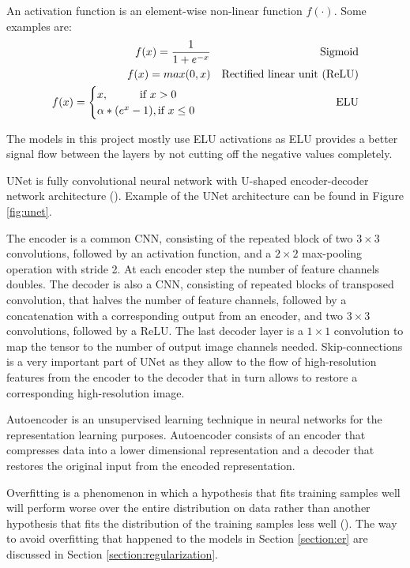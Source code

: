 \begin{definition}
	An activation function is an element-wise non-linear function $f(\cdot)$. Some examples are:
	\begin{align}             
		f(x) = \frac{1}{1 + e^{-x}} &&\text{Sigmoid} \\      
		f(x) = max(0, x) &&\text{Rectified linear unit (ReLU)}\\
		f(x) = \begin{cases}
				x, \hspace*{1cm} \textrm{if } x > 0 \\
				\alpha * (e^{x} - 1), \textrm{if }  x \leq 0
		  	\end{cases}\ &&\text{ELU}
		\end{align}
\end{definition}

The models in this project mostly use ELU activations as ELU provides a better signal flow between the layers by not cutting off the negative values completely.

\begin{definition}[UNet]
	UNet is fully convolutional neural network with U-shaped encoder-decoder network architecture (\cite{Ronneberger_2015}). Example of the UNet architecture can be found in Figure \ref{fig:unet}.
\end{definition}

The encoder is a common CNN, consisting of the repeated
block of two $3 \times 3$ convolutions, followed by
an activation function, and a $2 \times 2$ max-pooling operation with stride 2. At each encoder step  the number of feature channels doubles. The decoder is also a CNN, consisting of repeated blocks of transposed convolution, that halves the number of feature channels, followed by a concatenation with a corresponding output from an encoder, and two $3 \times 3$ convolutions, followed by a ReLU. The last decoder layer is a $1 \times 1$ convolution to map the tensor to the number of output image channels needed. Skip-connections is a very important part of UNet as they allow to the flow of high-resolution features from the encoder to the decoder that in turn allows to restore a corresponding high-resolution image.

\begin{definition}[Autoencoder]
	Autoencoder is an unsupervised learning technique in neural networks for the representation learning purposes. Autoencoder consists of an encoder that compresses data into a lower dimensional representation and a decoder that restores the original input from the encoded representation.
\end{definition}

\begin{definition}[Overfitting]
	Overfitting is a phenomenon in which a hypothesis that fits training samples well will perform worse over the entire distribution on data rather than another hypothesis that fits the distribution of the training samples less well (\cite{mitchell_1997}). The way to avoid overfitting that happened to the models in Section \ref{section:er} are discussed in Section \ref{section:regularization}.
\end{definition}
